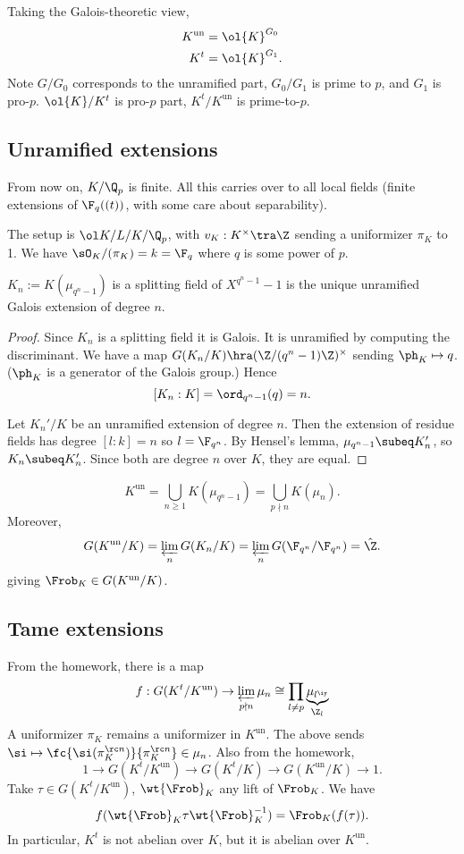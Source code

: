 Taking the Galois-theoretic view,
\begin{align*}
K^{\text{un}}&=\ol{K}^{G_0}\\
K^{t}&=\ol{K}^{G_1}.
\end{align*}
Note $G/G_0$ corresponds to the unramified part, $G_0/G_1$ is prime to $p$, and $G_1$ is pro-$p$. $\ol{K}/K^t$ is pro-$p$ part, $K^t/K^{\text{un}}$ is prime-to-$p$.
\subsection{Unramified extensions}
From now on, $K/\Q_p$ is finite. All this carries over to all local fields (finite extensions of $\F_q((t))$, with some care about separability).

The setup is $\ol K/L/K/\Q_p$, with $v_K:K^{\times}\tra \Z$ sending a uniformizer $\pi_K$ to 1. We have $\sO_K/(\pi_K)=k=\F_q$ where $q$ is some power of $p$.
\begin{lem}
$K_n:=K(\mu_{q^n-1})$ is a splitting field of $X^{q^n-1}-1$ is the unique unramified Galois extension of degree $n$.
\end{lem}
\begin{proof}
Since $K_n$ is a splitting field it is Galois. It is unramified by computing the discriminant. We have a map $G(K_n/K)\hra (\Z/(q^n-1)\Z)^{\times}$ sending $\ph_K\mapsto q$. ($\ph_K$ is a generator of the Galois group.) Hence
\[
[K_n:K]=\ord_{q^n-1}(q)=n.
\]

Let $K_n'/K$ be an unramified extension of degree $n$. Then the extension of residue fields has degree $[l:k]=n$ so $l=\F_{q^n}$. By Hensel's lemma, $\mu_{q^n-1}\subeq K_n'$, so $K_n\subeq K_n'$. Since both are degree $n$ over $K$, they are equal.
\end{proof}
\begin{cor}
\[K^{\text{un}}=\bigcup_{n\ge 1}K(\mu_{q^n-1})=\bigcup_{p\nmid n} K(\mu_n).\]
Moreover,
\[
G(K^{\text{un}}/K)
=\varprojlim_n G(K_n/K)
=\varprojlim_n G(\F_{q^n}/\F_{q^n})
=\hat{\Z}.
\]
giving $\Frob_K\in G(K^{\text{un}}/K)$.
\end{cor}
\subsection{Tame extensions}
From the homework, there is a map
\[
f:G(K^t/K^{\text{un}}) \to \varprojlim_{p\nmid n} \mu_n
\cong \prod_{l\ne p} \underbrace{\mu_{l^{\iy}}}_{\Z_l}%
\]
A uniformizer $\pi_K$ remains a uniformizer in $K^{\text{un}}$. The above sends $\si\mapsto \fc{\si(\pi_K^{\rc n})}{\pi_K^{\rc n}}\in \mu_n$. Also from the homework,
\[
1\to G(K^t/K^{\text{un}}) \to G(K^t/K) \to G(K^{\text{un}}/K)\to 1.
\]
Take $\tau\in G(K^t/K^{\text{un}})$, $\wt{\Frob}_K$ any lift of $\Frob_K$. We have
\[
f(\wt{\Frob}_K \tau \wt{\Frob}_K^{-1})=\Frob_K(f(\tau)).
\]
In particular, $K^t$ is not abelian over $K$, but it is abelian over $K^{\text{un}}$. 

